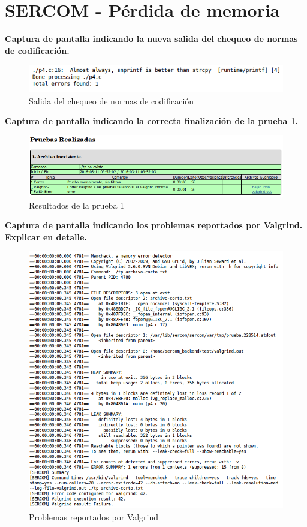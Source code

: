 \documentclass{article}
\begin{document}
\section{SERCOM - Pérdida de memoria}

\textbf{Captura de pantalla indicando la nueva salida del chequeo de normas de codificación.}
    \begin{figure}[H]
        \includegraphics[width=\columnwidth]{p4_style}
        \caption{Salida del chequeo de normas de codificación}
    \end{figure}
    
\textbf{Captura de pantalla indicando la correcta finalización de la prueba 1.}
    \begin{figure}[H]
        \includegraphics[width=\columnwidth]{p4_test1}
        \caption{Resultados de la prueba 1}
    \end{figure}

\textbf{Captura de pantalla indicando los problemas reportados por Valgrind. Explicar en detalle.}   
    \begin{figure}[H]
        \includegraphics[width=\columnwidth]{p4_valgrind}
        \caption{Problemas reportados por Valgrind}
    \end{figure}
    
\end{document}
